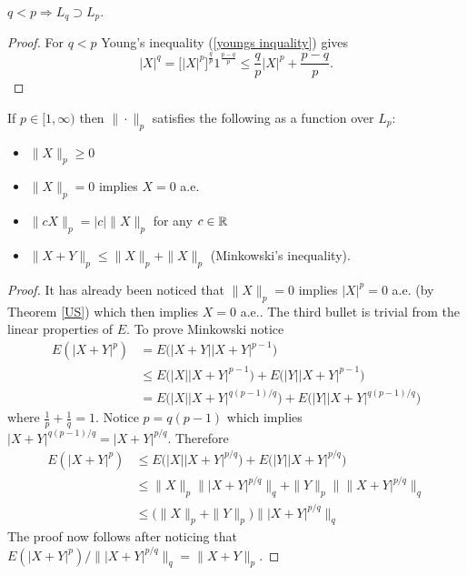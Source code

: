 \begin{theorem} $q<p \Longrightarrow L_q \supset L_p$.
\end{theorem}
\begin{proof}
For $q<p$
Young's inequality (\ref{youngs inquality}) gives
\begin{equation}
\label{p bounds q}
|X|^q = \bigl[|X|^p\bigr]^{\frac{q}{p}} 1^{\frac{p-q}{p}} \leq \frac{q}{p}|X|^p + \frac{p-q}{p}.
\end{equation}
\end{proof}



\begin{theorem}
\label{pnorm is a pseudo-norm}
If $p\in [1,\infty)$ then
$\|\cdot \|_p$ satisfies the following as a function over $L_p$:
\begin{itemize}
\item $\| X \|_p \geq 0$
\item $\| X \|_p = 0$ implies $X = 0$ a.e.
\item $\| c X \|_p = |c| \| X \|_p$ for any $c\in \Bbb R$
\item $\| X + Y \|_p \leq \| X \|_p + \| X \|_p$ (Minkowski's inequality).
\end{itemize}
\end{theorem}
\begin{proof}
It has already been noticed that $\| X\|_p=0$ implies $|X|^p=0$ a.e. (by Theorem \ref{US}) which then implies $X=0$ a.e.. The third bullet is trivial from the linear properties of $E$. To prove Minkowski notice
\begin{align*}
E(|X+Y|^p)
& = E\bigl(|X+Y| |X+Y|^{p-1}\bigr) \\
& \leq E\bigl(|X| |X+Y|^{p-1}\bigr) + E\bigl(|Y| |X+Y|^{p-1}\bigr)\\
& = E\bigl(|X| |X+Y|^{q(p-1)/q}\bigr) + E\bigl(|Y| |X+Y|^{q(p-1)/q}\bigr)
\end{align*}
where $\frac{1}{p} + \frac{1}{q} =1$. Notice  $p = q(p-1)$ which implies $|X+Y|^{q(p-1)/q} = |X+Y|^{p/q}$. Therefore
\begin{align*}
E(|X+Y|^p)
& \leq E\bigl(|X| |X+Y|^{p/q}\bigr) + E\bigl(|Y| |X+Y|^{p/q}\bigr) \\
&\leq \|X\|_p \| |X+Y |^{p/q}\|_q + \|Y\|_p \| \|X+Y|^{p/q}\|_q \\
&\leq \bigl(\|X\|_p  + \|Y\|_p\bigr)  \| |X+Y|^{p/q}\|_q
\end{align*}
The proof now follows after noticing that  $E(|X+Y|^p)/ \| |X+Y|^{p/q}\|_q =  \| X+Y\|_p$.
\end{proof}

